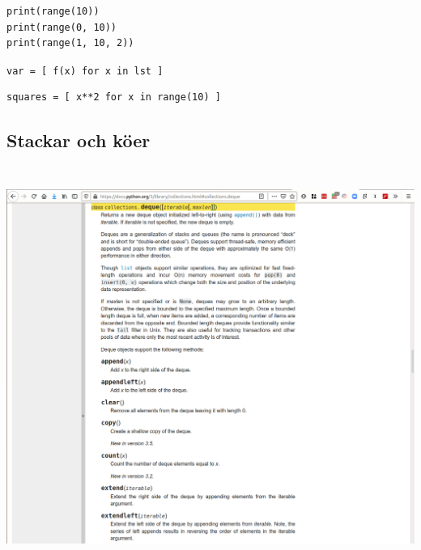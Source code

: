 \begin{frame}[fragile]
  \begin{example}
    \begin{verbatim}
print(range(10))
print(range(0, 10))
print(range(1, 10, 2))
    \end{verbatim}
  \end{example}
\end{frame}


\begin{frame}[fragile]
  \texttt{var = [ f(x) for x in lst ]}
\end{frame}

\begin{frame}[fragile]
  \begin{example}
    \begin{verbatim}
squares = [ x**2 for x in range(10) ]
    \end{verbatim}
  \end{example}
\end{frame}


\subsection{Stackar och köer}

\begin{frame}[fragile]
  \begin{example}[pile.py]
    \inputminted{python}{examples/pile.py}
  \end{example}
\end{frame}

\begin{frame}[fragile]
  \begin{example}[queue.py]
    \inputminted{python}{examples/queue.py}
  \end{example}
\end{frame}

\begin{frame}
  \includegraphics[width=\columnwidth]{figs/docs-deque.png}
\end{frame}


